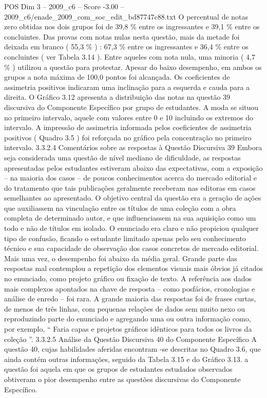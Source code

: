 \begin{textsample}{POS Dim 3 – 2009\_c6 – Score -3.00 – 2009\_c6/enade\_2009\_com\_soc\_edit\_bd87747c88.txt}
O percentual de notas zero obtidas nos dois grupos foi de 39,8 \% entre os ingressantes e 39,1 \% entre os concluintes.
Das provas com notas nulas nesta questão, mais da metade foi deixada em branco ( 55,3 \% ) : 67,3 \% entre os ingressantes e 36,4 \% entre os concluintes ( ver Tabela 3.14 ).
Entre aqueles com nota nula, uma minoria ( 4,7 \% ) utilizou a questão para protestar.
Apesar do baixo desempenho, em ambos os grupos a nota máxima de 100,0 pontos foi alcançada.
Os coeficientes de assimetria positivos indicaram uma inclinação para a esquerda e cauda para a direita.
O Gráfico 3.12 apresenta a distribuição das notas na questão 39 discursiva do Componente Específico por grupo de estudantes.
A moda se situou no primeiro intervalo, aquele com valores entre 0 e 10 incluindo os extremos do intervalo.
A impressão de assimetria informada pelos coeficientes de assimetria positivos ( Quadro 3.5 ) foi reforçada no gráfico pela concentração no primeiro intervalo. 3.3.2.4 Comentários sobre as respostas à Questão Discursiva 39 Embora seja considerada uma questão de nível mediano de dificuldade, as respostas apresentadas pelos estudantes estiveram abaixo das expectativas, com a exposição – na maioria dos casos – de poucos conhecimentos acerca do mercado editorial e do tratamento que tais publicações geralmente receberam nas editoras em casos semelhantes ao apresentado.
O objetivo central da questão era a geração de ações que auxiliassem na vinculação entre os títulos de uma coleção com a obra completa de determinado autor, e que influenciassem na sua aquisição como um todo e não de títulos em isolado.
O enunciado era claro e não propiciou qualquer tipo de confusão, ficando o estudante limitado apenas pelo seu conhecimento técnico e sua capacidade de observação dos casos concretos de mercado editorial.
Mais uma vez, o desempenho foi abaixo da média geral.
Grande parte das respostas mal contemplou a repetição dos elementos visuais mais óbvios já citados no enunciado, como projeto gráfico ou fixação de texto.
A referência aos dados mais complexos apontados na chave de resposta – como posfácios, cronologias e análise de enredo – foi rara.
A grande maioria das respostas foi de frases curtas, de menos de três linhas, com pequenas relações de dados sem muito nexo ou reproduzindo parte do enunciado e agregando uma ou outra informação como, por exemplo, “ Faria capas e projetos gráficos idênticos para todos os livros da coleção ”. 3.3.2.5 Análise da Questão Discursiva 40 do Componente Específico A questão 40, cujas habilidades aferidas encontram -se descritas no Quadro 3.6, que ainda contém outras informações, seguido da Tabela 3.15 e do Gráfico 3.13. a questão foi aquela em que os grupos de estudantes estudados observados obtiveram o pior desempenho entre as questões discursivas do Componente Específico.

\end{textsample}
